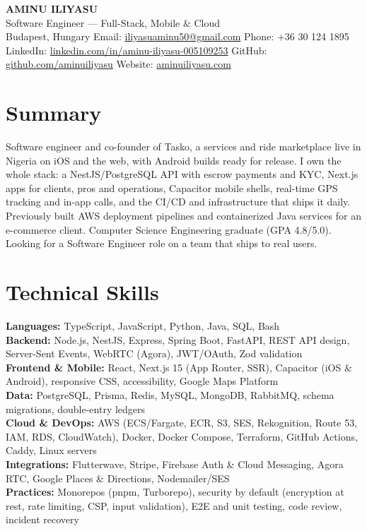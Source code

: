 \documentclass[10pt,a4paper]{article}
\begin{document}
\begin{center}
    {\color{primary}\Huge\bfseries AMINU ILIYASU}\\[2pt]
    {\large Software Engineer --- Full-Stack, Mobile \& Cloud}\\[3pt]
    \small
    Budapest, Hungary \quad
    Email: \href{mailto:iliyasuaminu50@gmail.com}{iliyasuaminu50@gmail.com} \quad
    Phone: +36 30 124 1895 \\[1pt]
    LinkedIn: \href{https://www.linkedin.com/in/aminu-iliyasu-005109253/}{linkedin.com/in/aminu-iliyasu-005109253} \quad
    GitHub: \href{https://github.com/aminuiliyasu}{github.com/aminuiliyasu} \quad
    Website: \href{https://aminuiliyasu.com}{aminuiliyasu.com}
\end{center}
\vspace{-6pt}

\section*{Summary}
\small
Software engineer and co-founder of Tasko, a services and ride marketplace live in Nigeria on iOS and the web, with Android builds ready for release. I own the whole stack: a NestJS/PostgreSQL API with escrow payments and KYC, Next.js apps for clients, pros and operations, Capacitor mobile shells, real-time GPS tracking and in-app calls, and the CI/CD and infrastructure that ships it daily. Previously built AWS deployment pipelines and containerized Java services for an e-commerce client. Computer Science Engineering graduate (GPA 4.8/5.0). Looking for a Software Engineer role on a team that ships to real users.

\section*{Technical Skills}
\small
\textbf{Languages:} TypeScript, JavaScript, Python, Java, SQL, Bash \\
\textbf{Backend:} Node.js, NestJS, Express, Spring Boot, FastAPI, REST API design, Server-Sent Events, WebRTC (Agora), JWT/OAuth, Zod validation \\
\textbf{Frontend \& Mobile:} React, Next.js 15 (App Router, SSR), Capacitor (iOS \& Android), responsive CSS, accessibility, Google Maps Platform \\
\textbf{Data:} PostgreSQL, Prisma, Redis, MySQL, MongoDB, RabbitMQ, schema migrations, double-entry ledgers \\
\textbf{Cloud \& DevOps:} AWS (ECS/Fargate, ECR, S3, SES, Rekognition, Route 53, IAM, RDS, CloudWatch), Docker, Docker Compose, Terraform, GitHub Actions, Caddy, Linux servers \\
\textbf{Integrations:} Flutterwave, Stripe, Firebase Auth \& Cloud Messaging, Agora RTC, Google Places \& Directions, Nodemailer/SES \\
\textbf{Practices:} Monorepos (pnpm, Turborepo), security by default (encryption at rest, rate limiting, CSP, input validation), E2E and unit testing, code review, incident recovery
\end{document}
